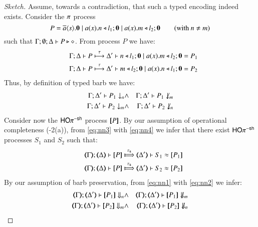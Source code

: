 \begin{proof}[Sketch]
	Assume, towards a contradiction, that such a typed encoding indeed exists. 
	Consider the $\pi$ process
	\[
		P = \overline{a} \langle s \rangle . \mathbf{0} \;|\; a (x) . n \triangleleft l_1 ; \mathbf{0} \;|\; a (x) . m \triangleleft l_2 ; \mathbf{0} \qquad \text{(with $n \neq m$)}
	\]
	\noi such that 
	$\Gamma; \emptyset; \Delta \vdash P \triangleright \diamond$.
	From process $P$ we have: %
	\begin{eqnarray}
		& & \Gamma; \Delta \vdash P \stackrel{\tau}{\longmapsto} \Delta' \vdash n \triangleleft l_1 ; \mathbf{0} \;|\; a (x) . m \triangleleft l_2 ; \mathbf{0} = P_1 \label{eq:nn3} \\
		& & \Gamma; \Delta \vdash P \stackrel{\tau}{\longmapsto} \Delta' \vdash m \triangleleft l_2 ; \mathbf{0} \;|\; a (x) . n \triangleleft l_1 ; \mathbf{0} = P_2 \label{eq:nn4}
	\end{eqnarray}
	Thus, by definition of typed barb we  have:
	\begin{eqnarray}
		\Gamma; \Delta' \vdash P_1 \downarrow_{n} & \land & 
		\Gamma; \Delta' \vdash P_1 \not\downarrow_{m} \label{eq:nn1} \\
		\Gamma; \Delta' \vdash P_2 \downarrow_{m} & \land & 
		\Gamma; \Delta' \vdash P_2 \not\downarrow_{n} \label{eq:nn2}
	\end{eqnarray}
	Consider now the $\mathsf{HO}\pi^{\mathsf{-sh}}$ process $[\!\![P]\!\!]$.
	By our assumption of operational completeness 
	(-2(a)), 
	from \eqref{eq:nn3} with \eqref{eq:nn4}
	we infer that
	there exist $\mathsf{HO}\pi^{\mathsf{-sh}}$ processes $S_1$ and $S_2$ such that:
	\begin{eqnarray}
		& & \horel{\mapt{\Gamma}}{\mapt{\Delta}}{\map{P}}{\Hby{\stau}}{\mapt{\Delta'}}{S_1 \wb \map{P_1}} \label{eq:n1} \\
		& & \horel{\mapt{\Gamma}}{\mapt{\Delta}}{\map{P}}{\Hby{\stau}}{\mapt{\Delta'}}{S_2 \wb \map{P_2}} \label{eq:n2}
	\end{eqnarray}
	By our assumption of barb preservation, 
	from \eqref{eq:nn1} with \eqref{eq:nn2}
	we infer: 
	\begin{eqnarray}
		\mapt{\Gamma}; \mapt{\Delta'} \proves \map{P_1} \Barb{n} & \land & 
		\mapt{\Gamma}; \mapt{\Delta'} \proves \map{P_1} \nBarb{m} \label{eq:n3} \\
		\mapt{\Gamma}; \mapt{\Delta'} \proves \map{P_2} \Barb{m} & \land & 
		\mapt{\Gamma}; \mapt{\Delta'} \proves \map{P_2} \nBarb{n} \label{eq:n4}

\end{eqnarray}
\end{proof}
